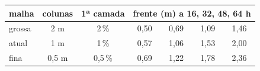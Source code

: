 \begin{tabular}{lcc|cccc}
\toprule
malha & colunas & 1ª camada & \multicolumn{4}{c}{frente (m) a 16, 32, 48, 64 h}\\
\midrule
grossa & 2 m & 2\,\% & 0{,}50 & 0{,}69 & 1{,}09 & 1{,}46\\
atual & 1 m & 1\,\% & 0{,}57 & 1{,}06 & 1{,}53 & 2{,}00\\
fina & 0,5 m & 0,5\,\% & 0{,}69 & 1{,}22 & 1{,}78 & 2{,}36\\
\bottomrule
\end{tabular}
